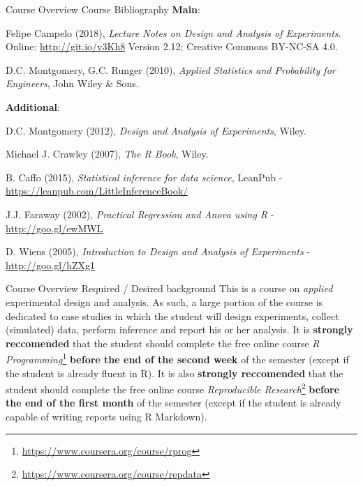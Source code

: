 \documentclass[t]{beamer}
\begin{document}
\begin{ftst}
{Course Overview}
{Course Bibliography}
\textbf{Main}:\\
{\footnotesize
\bitems Felipe Campelo (2018), \textit{Lecture Notes on Design and Analysis of Experiments}. Online: \url{http://git.io/v3Kh8} Version 2.12; Creative Commons BY-NC-SA 4.0.
\item D.C. Montgomery, G.C. Runger (2010), \textit{Applied Statistics and Probability for Engineers}, John Wiley \& Sons.
\eitem}
\vhalf
\textbf{Additional}:
{\footnotesize
\bitems D.C. Montgomery (2012), \textit{Design and Analysis of Experiments}, Wiley.
\item Michael J. Crawley (2007), \textit{The R Book}, Wiley.
\item B. Caffo (2015), \textit{Statistical inference for data science}, LeanPub - {\small\url{https://leanpub.com/LittleInferenceBook/}}
\item J.J. Faraway (2002), \textit{Practical Regression and Anova using R} - {\small\url{http://goo.gl/ewMWL}}
\item D. Wiens (2005), \textit{Introduction to Design and Analysis of Experiments} - {\small\url{http://goo.gl/hZXg1}}
\eitem}
\end{ftst}


\begin{ftst}
{Course Overview}
{Required / Desired background}
This is a course on \textit{applied} experimental design and analysis. As such, a large portion of the course is dedicated to case studies in which the student will design experiments, collect (simulated) data, perform inference and report his or her analysis.
\vone
It is \textbf{strongly reccomended} that the student should complete the free online course  \textit{R Programming}\footnote{{\scriptsize\url{https://www.coursera.org/course/rprog}}} \textbf{before the end of the second week} of the semester (except if the student is already fluent in R).
\vone
It is also \textbf{strongly reccomended} that the student should complete the free online course  \textit{Reproducible Research}\footnote{{\scriptsize\url{https://www.coursera.org/course/repdata}}} \textbf{before the end of the first month} of the semester (except if the student is already capable of writing reports using R Markdown).
\end{ftst}




\end{document}

